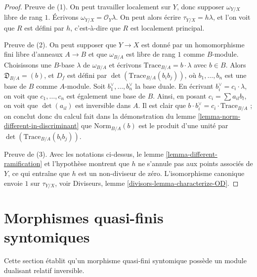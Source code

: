 \begin{proof}
Preuve de (1). On peut travailler localement sur $Y$, donc supposer
$\omega_{Y/X}$ libre de rang $1$. Écrivons $\omega_{Y/X} = \mathcal{O}_Y\lambda$.
On peut alors écrire $\tau_{Y/X} = h \lambda$, et l'on voit que
$R$ est défini par $h$, c'est-à-dire que $R$ est localement principal.

\medskip\noindent
Preuve de (2). On peut supposer que $Y \to X$ est donné par un homomorphisme fini libre
d'anneaux $A \to B$ et que $\omega_{B/A}$ est libre de rang $1$ comme $B$-module.
Choisissons une $B$-base $\lambda$ de $\omega_{B/A}$ et écrivons
$\text{Trace}_{B/A} = b \cdot \lambda$ avec $b \in B$.
Alors $\mathfrak{D}_{B/A} = (b)$, et $D_f$ est défini par
$\det(\text{Trace}_{B/A}(b_ib_j))$, où $b_1, \ldots, b_n$ est une
base de $B$ comme $A$-module. Soit $b_1^\vee, \ldots, b_n^\vee$
la base duale.
En écrivant $b_i^\vee = c_i \cdot \lambda$, on voit que
$c_1, \ldots, c_n$ est également une base de $B$.
Ainsi, en posant $c_i = \sum a_{il}b_l$, on voit que $\det(a_{il})$
est inversible dans $A$. Il est clair que
$b \cdot b_i^\vee = c_i \cdot \text{Trace}_{B/A}$ ;
on conclut donc du calcul fait dans la démonstration du
lemme \ref{lemma-norm-different-in-discriminant}
que $\text{Norm}_{B/A}(b)$ est le produit d'une unité par
$\det(\text{Trace}_{B/A}(b_ib_j))$.

\medskip\noindent
Preuve de (3). Avec les notations ci-dessus, le
lemme \ref{lemma-different-ramification} et l'hypothèse montrent
que $h$ ne s'annule pas aux
points associés de $Y$, ce qui entraîne que $h$ est un non-diviseur de zéro.
L'isomorphisme canonique envoie $1$ sur $\tau_{Y/X}$, voir
Diviseurs, lemme \ref{divisors-lemma-characterize-OD}.
\end{proof}







\section{Morphismes quasi-finis syntomiques}
\label{section-quasi-finite-syntomic}

\noindent
Cette section établit qu'un morphisme quasi-fini syntomique
possède un module dualisant relatif inversible.

